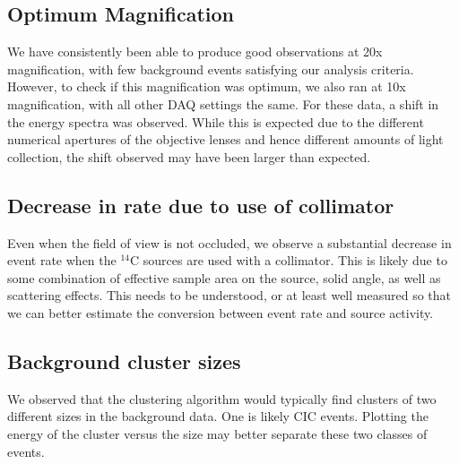 \documentclass[11pt]{article}
\newcommand{\nuc}[2]{\ensuremath{^{#1}}#2}
\begin{document}
\subsection{Optimum Magnification}
We have consistently been able to produce good observations at 20x magnification, with few background events satisfying our analysis criteria. However, to check if this magnification was optimum, we also ran at 10x magnification, with all other DAQ settings the same. For these data, a shift in the energy spectra was observed. While this is expected due to the different numerical apertures of the objective lenses and hence different amounts of light collection, the shift observed may have been larger than expected. 

\subsection{Decrease in rate due to use of collimator}
Even when the field of view is not occluded, we observe a substantial decrease in event rate when the \nuc{14}{C} sources are used with a collimator. This is likely due to some combination of 
effective sample area on the source, solid angle, as well as scattering effects. This needs to be understood, or at least well measured so that we can better estimate the conversion between event rate and source activity.

\subsection{Background cluster sizes}
We observed that the clustering algorithm would typically find clusters of two different sizes in the background data. One is likely CIC events. Plotting the energy of the cluster versus the size may better separate these two classes of events. 
\end{document}
